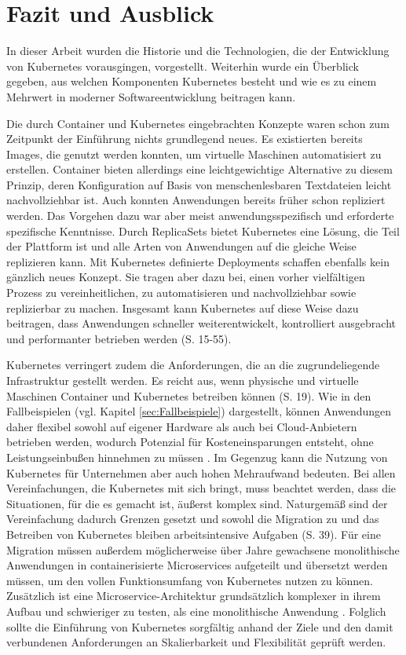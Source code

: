 \documentclass[11pt,a4paper]{article}
\begin{document}
\section{Fazit und Ausblick}
In dieser Arbeit wurden die Historie und die Technologien, die der Entwicklung von Kubernetes
vorausgingen, vorgestellt. Weiterhin wurde ein Überblick gegeben, aus welchen Komponenten
Kubernetes besteht und wie es zu einem Mehrwert in moderner Softwareentwicklung
beitragen kann.

Die durch Container und Kubernetes eingebrachten Konzepte waren schon zum Zeitpunkt der Einführung
nichts grundlegend neues.
Es existierten bereits Images, die genutzt werden konnten, um virtuelle Maschinen automatisiert
zu erstellen. Container bieten allerdings eine leichtgewichtige Alternative zu diesem Prinzip,
deren Konfiguration auf Basis von menschenlesbaren Textdateien leicht nachvollziehbar ist.
Auch konnten Anwendungen bereits früher schon repliziert werden.
Das Vorgehen dazu war aber meist anwendungsspezifisch und erforderte spezifische Kenntnisse.
Durch ReplicaSets bietet Kubernetes eine Lösung, die Teil der Plattform ist
und alle Arten von Anwendungen auf die gleiche Weise replizieren kann.
Mit Kubernetes definierte Deployments schaffen ebenfalls kein gänzlich neues Konzept.
Sie tragen aber dazu bei, einen vorher vielfältigen Prozess zu vereinheitlichen,
zu automatisieren und nachvollziehbar sowie replizierbar zu machen.
Insgesamt kann Kubernetes auf diese Weise dazu beitragen, dass
Anwendungen schneller weiterentwickelt, kontrolliert ausgebracht und
performanter betrieben werden \cite{Schmeling_Dargatz_2022} (S. 15-55).

Kubernetes verringert zudem die Anforderungen, die an die zugrundeliegende
Infrastruktur gestellt werden. Es reicht aus, wenn physische und virtuelle Maschinen
Container und Kubernetes betreiben können \cite{cicd_with_kubernetes_devops} (S. 19).
Wie in den Fallbeispielen (vgl. Kapitel \ref{sec:Fallbeispiele}) dargestellt, können Anwendungen daher
flexibel sowohl auf eigener Hardware als auch bei Cloud-Anbietern betrieben werden,
wodurch Potenzial für Kosteneinsparungen entsteht, ohne Leistungseinbußen
hinnehmen zu müssen \cite{story_openai}.
Im Gegenzug kann die Nutzung von Kubernetes für Unternehmen aber auch
hohen Mehraufwand bedeuten.
Bei allen Vereinfachungen, die Kubernetes mit sich bringt, muss beachtet werden,
dass die Situationen, für die es gemacht ist, äußerst komplex sind.
Naturgemäß sind der Vereinfachung dadurch Grenzen gesetzt und
sowohl die Migration zu und das Betreiben von Kubernetes bleiben
arbeitsintensive Aufgaben \cite{domingus2022cloud} (S. 39).
Für eine Migration müssen außerdem möglicherweise über Jahre gewachsene monolithische
Anwendungen in containerisierte Microservices aufgeteilt und übersetzt werden müssen,
um den vollen Funktionsumfang von Kubernetes nutzen zu können.
Zusätzlich ist eine Microservice-Architektur grundsätzlich komplexer
in ihrem Aufbau und schwieriger zu testen, als eine monolithische Anwendung \cite{8406008}.
Folglich sollte die Einführung von Kubernetes sorgfältig anhand der Ziele
und den damit verbundenen Anforderungen an Skalierbarkeit und Flexibilität
geprüft werden.
\end{document}
